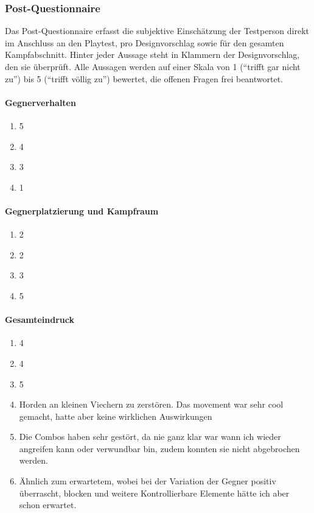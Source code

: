 \documentclass[../Main.tex]{subfiles}
\begin{document}
\subsubsection{Post-Questionnaire}
 
Das Post-Questionnaire erfasst die subjektive Einschätzung der Testperson direkt im Anschluss an den Playtest, pro Designvorschlag sowie für den gesamten Kampfabschnitt. Hinter jeder Aussage steht in Klammern der Designvorschlag, den sie überprüft. Alle Aussagen werden auf einer Skala von 1 (\enquote{trifft gar nicht zu}) bis 5 (\enquote{trifft völlig zu}) bewertet, die offenen Fragen frei beantwortet.
 
\paragraph{Gegnerverhalten}
\begin{enumerate}[label=\textbf{Q\arabic*}, leftmargin=1.5cm, itemsep=0.5em]
    \item 5
    \item 4
    \item 3
    \item 1
\end{enumerate}
 
\paragraph{Gegnerplatzierung und Kampfraum}
\begin{enumerate}[label=\textbf{Q\arabic*}, leftmargin=1.5cm, itemsep=0.5em, resume]
    \item 2
    \item 2
    \item 3
    \item 5
\end{enumerate}
 
\paragraph{Gesamteindruck}
\begin{enumerate}[label=\textbf{Q\arabic*}, leftmargin=1.5cm, itemsep=0.5em, resume]
    \item 4
    \item 4
    \item 5
    \item Horden an kleinen Viechern zu zerstören. Das movement war sehr cool gemacht, hatte aber keine wirklichen Auswirkungen
    \item Die Combos haben sehr gestört, da nie ganz klar war wann ich wieder angreifen kann oder verwundbar bin, zudem konnten sie nicht abgebrochen werden.
    \item Ähnlich zum erwartetem, wobei bei der Variation der Gegner positiv überrascht, blocken und weitere Kontrollierbare Elemente hätte ich aber schon erwartet.
\end{enumerate}
\end{document}
